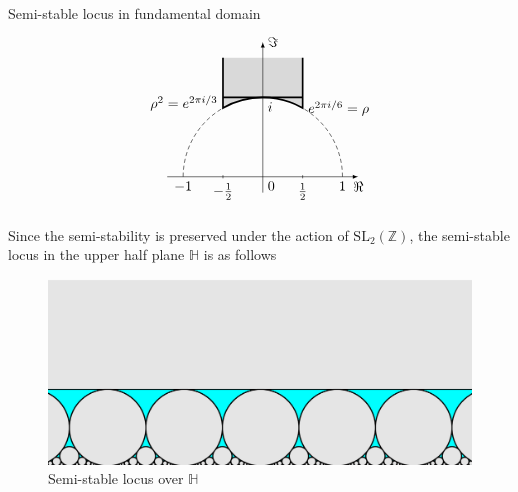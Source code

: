 \documentclass[pdf]{beamer}
\begin{document}
\begin{frame}{Semi-stable locus in fundamental domain}
    \[
        \begin{tikzpicture}[scale=2]
            \draw[densely dashed] (1,0) arc (0:60:1) (-1,0) arc (180:120:1);
            \draw[very thick, fill=gray!30] (.5,1.5) --node[right, pos=1]{$e^{2\pi i/6}=\rho$} (60:1) arc (60:120:1)
            --node[left, pos=.1]{$\rho^2=e^{2\pi i/3}$} (-.5,1.5);
            \draw[-latex] (-1.2,0) -- (1.2,0)node[below]{$\Re$};
            \draw[-latex] (0,-.2) -- (0,1.7)node[right]{$\Im$};
            \path(-1,0) --node[below, pos=0]{$-1$}node[below right, pos=.5]{0}node[below, pos=1]{1} (1,0)
            (0,1)node[below right]{$i$};
            \draw(-.5,.02)--(-.5,-.02)node[below]{$-\frac{1}{2}$}(.5,.02)--(.5,-.02)node[below]{$\frac{1}{2}$};
            \draw[very thick, fill=red!30] (-0.5,1) -- (0.5,1);
        \end{tikzpicture}\]
\end{frame}
\begin{frame}
    Since the semi-stability is preserved under the action of $\text{SL}_2(\mathbb{Z})$, the semi-stable locus in the
    upper half plane $\mathbb{H}$ is as follows

\end{frame}
\begin{frame}
    \begin{figure}[h]
        \includegraphics[width = \textwidth]{ss-locus.png}
        \caption{Semi-stable locus over $\mathbb{H}$}
    \end{figure}
\end{frame}
\end{document}
